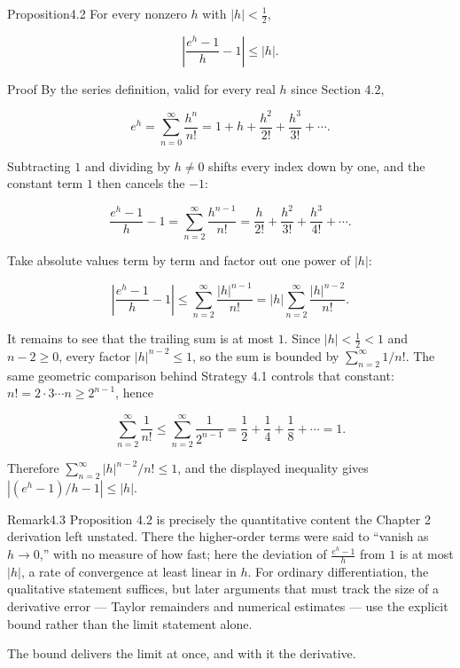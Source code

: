 \documentclass[a4paper,12pt,oneside]{memoir}
\begin{document}
\begin{envproposition}{Proposition}{4.2}{}
For every nonzero \(h\) with \(\lvert h \rvert < \tfrac{1}{2}\),

\[ \left\lvert \frac{e^{h} - 1}{h} - 1 \right\rvert \le \lvert h \rvert. \]
\end{envproposition}
\begin{envproof}{Proof}{}{}
By the series definition, valid for every real \(h\) since Section 4.2,

\[ e^{h} = \sum_{n=0}^{\infty} \frac{h^{n}}{n!} = 1 + h + \frac{h^{2}}{2!} + \frac{h^{3}}{3!} + \cdots. \]

Subtracting \(1\) and dividing by \(h \ne 0\) shifts every index down by one, and the constant term \(1\) then cancels the \(-1\):

\[ \frac{e^{h} - 1}{h} - 1 = \sum_{n=2}^{\infty} \frac{h^{n - 1}}{n!} = \frac{h}{2!} + \frac{h^{2}}{3!} + \frac{h^{3}}{4!} + \cdots. \]

Take absolute values term by term and factor out one power of \(\lvert h \rvert\):

\[ \left\lvert \frac{e^{h} - 1}{h} - 1 \right\rvert \le \sum_{n=2}^{\infty} \frac{\lvert h \rvert^{n - 1}}{n!} = \lvert h \rvert \sum_{n=2}^{\infty} \frac{\lvert h \rvert^{n - 2}}{n!}. \]

It remains to see that the trailing sum is at most \(1\). Since \(\lvert h \rvert < \tfrac{1}{2} < 1\) and \(n - 2 \ge 0\), every factor \(\lvert h \rvert^{n - 2} \le 1\), so the sum is bounded by \(\sum_{n=2}^{\infty} 1/n!\). The same geometric comparison behind Strategy 4.1 controls that constant: \(n! = 2 \cdot 3 \cdots n \ge 2^{n - 1}\), hence

\[ \sum_{n=2}^{\infty} \frac{1}{n!} \le \sum_{n=2}^{\infty} \frac{1}{2^{n - 1}} = \frac{1}{2} + \frac{1}{4} + \frac{1}{8} + \cdots = 1. \]

Therefore \(\sum_{n=2}^{\infty} \lvert h \rvert^{n - 2}/n! \le 1\), and the displayed inequality gives \(\left\lvert (e^{h} - 1)/h - 1 \right\rvert \le \lvert h \rvert\). \qedmark
\end{envproof}
\begin{envremark}{Remark}{4.3}{}
Proposition 4.2 is precisely the quantitative content the Chapter 2 derivation left unstated. There the higher-order terms were said to “vanish as \(h \to 0\),” with no measure of how fast; here the deviation of \(\frac{e^{h} - 1}{h}\) from \(1\) is at most \(\lvert h \rvert\), a rate of convergence at least linear in \(h\). For ordinary differentiation, the qualitative statement suffices, but later arguments that must track the size of a derivative error — Taylor remainders and numerical estimates — use the explicit bound rather than the limit statement alone.
\end{envremark}
The bound delivers the limit at once, and with it the derivative.
\end{document}
